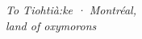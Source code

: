 \clearpage
\thispagestyle{plain}
\vspace*{10ex}
{\raggedleft\itshape To Tiohtià:ke · Montréal,\\ land of oxymorons\par}
\clearpage
